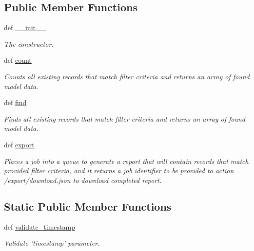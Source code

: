 \subsection*{Public Member Functions}
\begin{DoxyCompactItemize}
\item 
def \hyperlink{classtune_1_1management_1_1reports_1_1reports__actuals__base_1_1ReportsActualsBase_ad6dd33811e39b883d39844d3a895fdb9}{\-\_\-\-\_\-init\-\_\-\-\_\-}
\begin{DoxyCompactList}\small\item\em The constructor. \end{DoxyCompactList}\item 
def \hyperlink{classtune_1_1management_1_1reports_1_1reports__actuals__base_1_1ReportsActualsBase_a152cce9b560399e908b65d68bc057d3c}{count}
\begin{DoxyCompactList}\small\item\em Counts all existing records that match filter criteria and returns an array of found model data. \end{DoxyCompactList}\item 
def \hyperlink{classtune_1_1management_1_1reports_1_1reports__actuals__base_1_1ReportsActualsBase_a5ec06fdd1b657010235b66d4a5521e44}{find}
\begin{DoxyCompactList}\small\item\em Finds all existing records that match filter criteria and returns an array of found model data. \end{DoxyCompactList}\item 
def \hyperlink{classtune_1_1management_1_1reports_1_1reports__actuals__base_1_1ReportsActualsBase_a88c5946314a561c7dc764c696b1d325e}{export}
\begin{DoxyCompactList}\small\item\em Places a job into a queue to generate a report that will contain records that match provided filter criteria, and it returns a job identifier to be provided to action /export/download.json to download completed report. \end{DoxyCompactList}\end{DoxyCompactItemize}
\subsection*{Static Public Member Functions}
\begin{DoxyCompactItemize}
\item 
def \hyperlink{classtune_1_1management_1_1reports_1_1reports__actuals__base_1_1ReportsActualsBase_a2808fb349b9515465dab9d2c1e12cafd}{validate\-\_\-timestamp}
\begin{DoxyCompactList}\small\item\em Validate 'timestamp' parameter. \end{DoxyCompactList}\end{DoxyCompactItemize}



